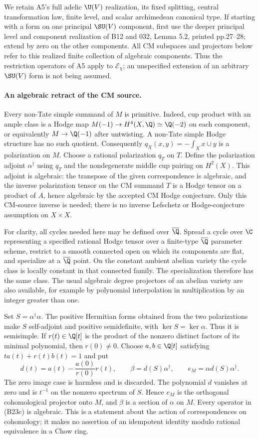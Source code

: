 We retain A5's full adelic $\U(V)$ realization, its fixed
splitting, central transformation law, finite level, and scalar
archimedean canonical type.  If starting with a form on one
principal $\SU(V)$ component, first use the deeper principal
level and component realization of B12 and 032, Lemma 5.2,
printed pp.27--28; extend by zero on the other components.
All CM subspaces and projectors below refer to this realized
finite collection of algebraic components.  Thus the restriction
operators of A5 apply to $\mathcal E_\chi$; an unspecified
extension of an arbitrary $\SU(V)$ form is not being assumed.

\paragraph{An algebraic retract of the CM source.}
Every non-Tate simple summand of $M$ is primitive.  Indeed,
cup product with an ample class is a Hodge map
$M(-1)\to H^4(X,\Q)\simeq\Q(-2)$ on each component,
or equivalently $M\to\Q(-1)$ after untwisting.  A
non-Tate simple Hodge structure has no such quotient.
Consequently $q_X(x,y)=-\int_Xx\cup y$ is a polarization
on $M$.  Choose a rational polarization $q_T$ on $T$.
Define the polarization adjoint $\alpha^\dagger$ using $q_T$
and the nondegenerate middle cup pairing on $H^2(X)$.
This adjoint is algebraic: the transpose of the given
correspondence is algebraic, and the inverse polarization
tensor on the CM summand $T$ is a Hodge tensor on a product
of $A$, hence algebraic by the accepted CM Hodge conjecture.
Only this CM-source inverse is needed; there is no inverse
Lefschetz or Hodge-conjecture assumption on $X\times X$.

For clarity, all cycles needed here may be defined over
$\overline\Q$.  Spread a cycle over $\C$ representing a
specified rational Hodge tensor over a finite-type
$\overline\Q$ parameter scheme, restrict to a smooth connected
open on which its components are flat, and specialize at a
$\overline\Q$ point.  On the constant ambient abelian variety
the cycle class is locally constant in that connected family.
The specialization therefore has the same class.  The usual
algebraic degree projectors of an abelian variety are also
available, for example by polynomial interpolation in
multiplication by an integer greater than one.

Set $S=\alpha^\dagger\alpha$.  The positive Hermitian forms
obtained from the two polarizations make $S$ self-adjoint and
positive semidefinite, with
$\ker S=\ker\alpha$.  Thus it is semisimple.  If $r(t)\in\Q[t]$
is the product of the nonzero distinct factors of its minimal
polynomial, then $r(0)\ne0$.  Choose $a,b\in\Q[t]$ satisfying
$ta(t)+r(t)b(t)=1$ and put
\[
 d(t)=a(t)-\frac{a(0)}{r(0)}r(t),\qquad
 \beta=d(S)\alpha^\dagger,
 \qquad e_M=\alpha d(S)\alpha^\dagger.
 \tag{B23c}
\]
The zero image case is harmless and is discarded.  The
polynomial $d$ vanishes at zero and is $t^{-1}$ on the
nonzero spectrum of $S$.  Hence $e_M$ is the orthogonal
cohomological projector onto $M$, and $\beta$ is a section
of $\alpha$ on $M$.  Every operator in (B23c) is algebraic.
This is a statement about the action of correspondences on
cohomology; it makes no assertion of an idempotent identity
modulo rational equivalence in a Chow ring.

